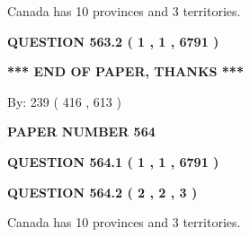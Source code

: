 \documentclass[12pt]{article}
\begin{document}
  
 
 
\noindent{}
 
 
Canada has 10  provinces and 3 territories.
 
 
 
 
  
\vspace{0.2in}
  
{\textbf{\Large{QUESTION
563.2 
 ( 1 , 1 , 6791 )
}}}
  
  
   
   
 \vspace{0.2in}
 
   
   
   
   
\vspace{1.0in} 
{\textbf{\large{ *** END OF PAPER, THANKS *** }}} 
   
   
\hspace{1.0in} By: 
 239 ( 416 ,  613 )
   
   
   
   
\newpage 
\setcounter{page}{ 
   564001 } 
   
   
   
   
 {\textbf{ \Large{ PAPER NUMBER  564  }}}
   
   
\vspace{0.2in}
   
   
   
   
   
   
 \vspace{0.2in}
 
 
 
 
   
   
  
\vspace{0.2in}
  
{\textbf{\Large{QUESTION
564.1 
 ( 1 , 1 , 6791 )
}}}
  
  
  
\vspace{0.2in}
  
{\textbf{\Large{QUESTION
564.2 
 ( 2 , 2 , 3 )
}}}
  
  
 
 
\noindent{}
 
 
Canada has 10  provinces and 3 territories.
 
\end{document}
